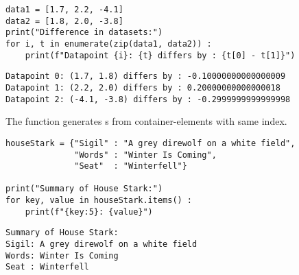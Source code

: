 \begin{frame}[fragile]
%
\begin{codebox}
\begin{verbatim}
data1 = [1.7, 2.2, -4.1]
data2 = [1.8, 2.0, -3.8]
print("Difference in datasets:")
for i, t in enumerate(zip(data1, data2)) :
    print(f"Datapoint {i}: {t} differs by : {t[0] - t[1]}")
\end{verbatim}
\end{codebox}
%
\begin{cmdbox}
\begin{verbatim}
Datapoint 0: (1.7, 1.8) differs by : -0.10000000000000009
Datapoint 1: (2.2, 2.0) differs by : 0.20000000000000018
Datapoint 2: (-4.1, -3.8) differs by : -0.2999999999999998
\end{verbatim}
\end{cmdbox}
%
\begin{hintbox}
The function  generates s from container-elements with same index.
\end{hintbox}
%
\end{frame}


\begin{frame}[fragile]
%
\begin{codebox}
\begin{verbatim}
houseStark = {"Sigil" : "A grey direwolf on a white field",
              "Words" : "Winter Is Coming",
              "Seat"  : "Winterfell"}

print("Summary of House Stark:")
for key, value in houseStark.items() :
    print(f"{key:5}: {value}")
\end{verbatim}
\end{codebox}
%
\begin{cmdbox}
\begin{verbatim}
Summary of House Stark:
Sigil: A grey direwolf on a white field
Words: Winter Is Coming
Seat : Winterfell
\end{verbatim}
\end{cmdbox}
%
\end{frame}

